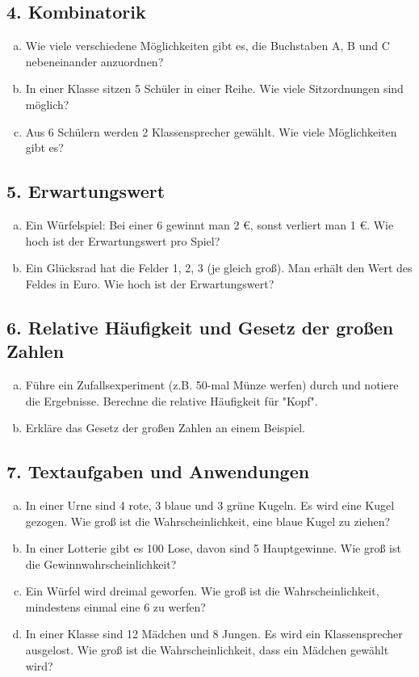 \subsection*{4. Kombinatorik}
\begin{enumerate}[a)]
    \item Wie viele verschiedene Möglichkeiten gibt es, die Buchstaben A, B und C nebeneinander anzuordnen?
    \item In einer Klasse sitzen 5 Schüler in einer Reihe. Wie viele Sitzordnungen sind möglich?
    \item Aus 6 Schülern werden 2 Klassensprecher gewählt. Wie viele Möglichkeiten gibt es?
\end{enumerate}

\subsection*{5. Erwartungswert}
\begin{enumerate}[a)]
    \item Ein Würfelspiel: Bei einer 6 gewinnt man 2 €, sonst verliert man 1 €. Wie hoch ist der Erwartungswert pro Spiel?
    \item Ein Glücksrad hat die Felder 1, 2, 3 (je gleich groß). Man erhält den Wert des Feldes in Euro. Wie hoch ist der Erwartungswert?
\end{enumerate}

\subsection*{6. Relative Häufigkeit und Gesetz der großen Zahlen}
\begin{enumerate}[a)]
    \item Führe ein Zufallsexperiment (z.B. 50-mal Münze werfen) durch und notiere die Ergebnisse. Berechne die relative Häufigkeit für "Kopf".
    \item Erkläre das Gesetz der großen Zahlen an einem Beispiel.
\end{enumerate}

\subsection*{7. Textaufgaben und Anwendungen}
\begin{enumerate}[a)]
    \item In einer Urne sind 4 rote, 3 blaue und 3 grüne Kugeln. Es wird eine Kugel gezogen. Wie groß ist die Wahrscheinlichkeit, eine blaue Kugel zu ziehen?
    \item In einer Lotterie gibt es 100 Lose, davon sind 5 Hauptgewinne. Wie groß ist die Gewinnwahrscheinlichkeit?
    \item Ein Würfel wird dreimal geworfen. Wie groß ist die Wahrscheinlichkeit, mindestens einmal eine 6 zu werfen?
    \item In einer Klasse sind 12 Mädchen und 8 Jungen. Es wird ein Klassensprecher ausgelost. Wie groß ist die Wahrscheinlichkeit, dass ein Mädchen gewählt wird?
\end{enumerate}

